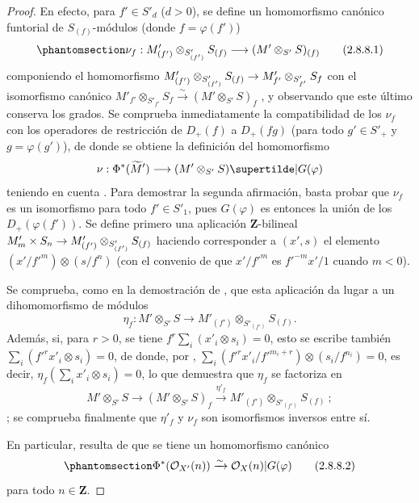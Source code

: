 \documentclass[oneside,10pt]{amsart}
\makeatletter
\newcommand{\ega@arrow}[2]{\mathchoice{#1}{#2}{#2}{#2}}
\renewcommand{\to}{\ega@arrow{\longrightarrow}{\rightarrow}}
\newcommand{\oldpage}[2][]{\marginnote{\normalfont\footnotesize\textbf{#1}~|~#2}\ignorespaces}
\let\EGAOriginalLabel\label
\renewcommand{\label}[1]{\phantomsection\EGAOriginalLabel{#1}}
\makeatother
\begin{document}
\begin{proof}
En efecto, para $f'\in S'_d$ ($d>0$), se define un homomorfismo canónico funtorial de $S_{(f)}$-módulos (donde $f=\varphi(f')$)
\[
\label{II.2.8.8.1-fr}
  \nu_f:M'_{(f')}\otimes_{S'_{(f')}}S_{(f)}
  \longrightarrow(M'\otimes_{S'}S)_{(f)}
\tag{2.8.8.1}
\]
componiendo el homomorfismo $M'_{(f')}\otimes_{S'_{(f')}}S_{(f)}\to
M'_{f'}\otimes_{S'_{f'}}S_f$ con el isomorfismo canónico $M'_{f'}\otimes_{S'_{f'}}S_f\xrightarrow{\sim}(M'\otimes_{S'}S)_f$ , y observando que este último conserva los grados.
Se comprueba inmediatamente la compatibilidad de los $\nu_f$ con los operadores de restricción de $D_+(f)$ a $D_+(fg)$ (para todo $g'\in S'_+$ y $g=\varphi(g')$), de donde se obtiene la definición del homomorfismo
\[
  \nu:\Phi^*(\widetilde{M}')
  \longrightarrow(M'\otimes_{S'}S)\supertilde|G(\varphi)
\]
teniendo en cuenta .
Para demostrar la segunda afirmación, basta probar que $\nu_f$ es un isomorfismo para todo $f'\in S'_1$, pues $G(\varphi)$ es entonces la unión de los $D_+(\varphi(f'))$.
Se define primero una aplicación $\mathbf{Z}$-bilineal $M'_m\times S_n\to M'_{(f')}\otimes_{S'_{(f')}}S_{(f)}$ haciendo corresponder a $(x',s)$ el elemento $(x'/{f'}^m)\otimes(s/f^n)$ (con el convenio de que $x'/{f'}^m$ es ${f'}^{-m}x'/1$ 
\oldpage[II]{45}
cuando $m<0$).

Se comprueba, como en la demostración de , que esta aplicación da lugar a un dihomomorfismo de módulos
\[
  \eta_f:M'\otimes_{S'}S
  \longrightarrow M'_{(f')}\otimes_{S'_{(f')}}S_{(f)}.
\]
Además, si, para $r>0$, se tiene $f^r\sum_i(x'_i\otimes s_i)=0$, esto se escribe también $\sum_i({f'}^rx'_i\otimes s_i)=0$, de donde, por , $\sum_i({f'}^rx'_i/{f'}^{m_i+r})\otimes(s_i/f^{n_i})=0$, es decir, $\eta_f(\sum_i x'_i\otimes s_i)=0$, lo que demuestra que $\eta_f$ se factoriza en \[
  M'\otimes_{S'}S\longrightarrow(M'\otimes_{S'}S)_f
  \xrightarrow{\eta'_f}M'_{(f')}\otimes_{S'_{(f')}}S_{(f)}~;
\]; se comprueba finalmente que $\eta'_f$ y $\nu_f$ son isomorfismos inversos entre sí.

En particular, resulta de  que se tiene un homomorfismo canónico
\[
\label{II.2.8.8.2-fr}
  \Phi^*(\mathcal{O}_{X'}(n))\xrightarrow{\sim}
  \mathcal{O}_X(n)|G(\varphi)
\tag{2.8.8.2}
\]
para todo $n\in\mathbf{Z}$.
\end{proof}
\end{document}
